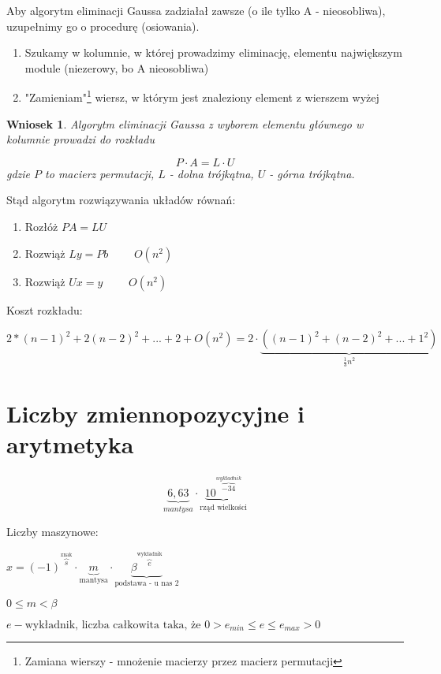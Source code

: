 \documentclass[hidelinks,a4paper]{article}
\newtheorem{wniosek}{Wniosek}
\begin{document}
Aby algorytm eliminacji Gaussa zadziałał zawsze (o ile tylko A - nieosobliwa), uzupełnimy go o procedurę  (osiowania). 

\begin{enumerate}
	\item Szukamy w kolumnie, w której prowadzimy eliminację, elementu  największym module (niezerowy, bo A nieosobliwa)
	\item "Zamieniam"\footnote{Zamiana wierszy - mnożenie macierzy przez macierz permutacji} wiersz, w którym jest znaleziony element z wierszem wyżej 
\end{enumerate}


\begin{wniosek} Algorytm eliminacji Gaussa z wyborem elementu głównego w kolumnie prowadzi do rozkładu
	
	\[
		P \cdot A = L \cdot U
	\]
	gdzie $P$ to macierz permutacji, $L$ - dolna trójkątna, $U$ - górna trójkątna.
	
\end{wniosek}

Stąd algorytm rozwiązywania układów równań:

\begin{enumerate}
	\item Rozłóż $PA = LU$
	\item Rozwiąż $Ly= Pb$ $\quad\quad O(n^2)$
	\item Rozwiąż $Ux = y$ $\quad\quad O(n^2)$
\end{enumerate}

Koszt rozkładu:

$2*(n-1)^2 + 2(n-2)^2 + ... + 2 + O(n^2) = 2 \cdot \underbrace{((n-1)^2 + (n-2)^2 + ... + 1^2)}_{\frac{1}{3}n^2}$


\section{Liczby zmiennopozycyjne i arytmetyka}

\[
	\underbrace{6,63}_{mantysa} \cdot \underbrace{10^{\overbrace{-34}^{wykładnik}}}_{\textrm{rząd wielkości}}
\]

Liczby maszynowe:

$x = (-1)^{\overbrace{s}^{\textrm{znak}}} \cdot \underbrace{m}_{\textrm{mantysa}} \cdot \underbrace{\beta^{\overbrace{e}^{\textrm{wykładnik}}}}_{\textrm{podstawa - u nas 2}}$

$0 \leq m < \beta$

$e - \textrm{wykładnik, liczba całkowita taka, że } 0 > e_{min} \leq e \leq e_{max} > 0$
\end{document}
